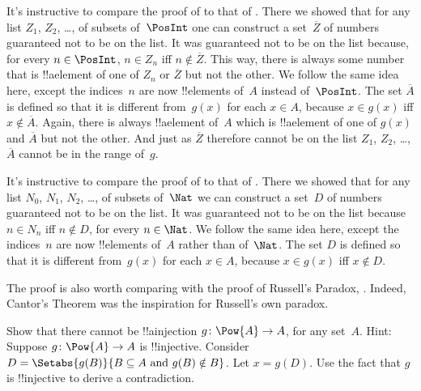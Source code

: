 \begin{explain}
It's instructive to
  compare the proof of  to that of
  . There we showed that for any list
  $Z_1$, $Z_2$, \dots, of subsets of~$\PosInt$ one can construct a
  set~$\overline{Z}$ of numbers guaranteed not to be on the list. It
  was guaranteed not to be on the list because, for every $n \in
  \PosInt$, $n \in Z_n$ iff $n \notin \overline{Z}$. This way, there
  is always some number that is !!a{element} of one of $Z_n$ or
  $\overline{Z}$ but not the other. We follow the same idea here,
  except the indices~$n$ are now !!{element}s of~$A$ instead
  of~$\PosInt$. The set $\overline{A}$ is defined so that it is
  different from~$g(x)$ for each $x \in A$, because $x \in g(x)$ iff
  $x \notin \overline{A}$. Again, there is always !!a{element} of~$A$
  which is !!a{element} of one of $g(x)$ and $\overline{A}$ but not
  the other. And just as $\overline{Z}$ therefore cannot be on the
  list $Z_1$, $Z_2$, \dots, $\overline{A}$ cannot be in the range
  of~$g$.

It's instructive to
  compare the proof of  to that of
  . There we showed that for any
  list $N_0$, $N_1$, $N_2$, \dots, of subsets of~$\Nat$ we can construct a
  set~$D$ of numbers guaranteed not to be on the list. It was
  guaranteed not to be on the list because $n \in N_n$ iff $n \notin
  D$, for every $n \in \Nat$. We follow the same idea here, except the
  indices~$n$ are now !!{element}s of~$A$ rather than of~$\Nat$. The
  set $D$ is defined so that it is different from~$g(x)$ for each $x
  \in A$, because $x \in g(x)$ iff $x \notin D$.

The proof is also worth comparing with the proof of Russell's Paradox,
. Indeed, Cantor's Theorem was
the inspiration for Russell's own paradox.
\end{explain}

\begin{prob}
  Show that there cannot be !!a{injection} $g\colon \Pow{A} \to
  A$, for any set~$A$. Hint: Suppose $g\colon \Pow{A} \to A$ is
  !!{injective}. Consider $D = \Setabs{g(B)}{B \subseteq A \text{ and
  } g(B) \notin B}$. Let $x = g(D)$. Use the fact that $g$ is
  !!{injective} to derive a contradiction. 
\end{prob}






